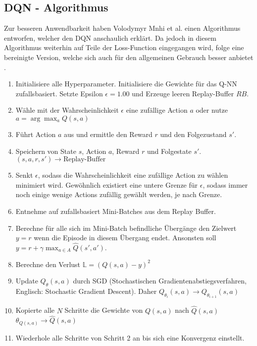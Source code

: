 \subsection{DQN - Algorithmus} \label{alg:DQN}
Zur besseren Anwendbarkeit haben Volodymyr Mnhi et al. einen Algorithmus entworfen, welcher den DQN anschaulich erklärt. Da jedoch in diesem Algorithmus weiterhin auf Teile der Loss-Function eingegangen wird, folge eine bereinigte Version, welche sich auch für den allgemeinen Gebrauch besser anbietet \cite[S. 149 f.]{DRL_Lapan}.
\begin{enumerate} 
	\item Initialisiere alle Hyperparameter. Initialisiere die Gewichte für das Q-NN zufallsbasiert. Setzte Epsilon $\epsilon = 1.00$ und Erzeuge leeren Replay-Buffer $RB$.
	\item Wähle mit der Wahrscheinlichkeit $\epsilon$  eine zufällige Action $a$ oder nutze $a = \arg\max_{a} Q(s,a)$
	\item Führt Action $a$ aus und ermittle den Reward $r$ und den Folgezustand $s'$.
	\item Speichern von State $s$, Action $a$, Reward $r$ und Folgestate $s'$. $(s,a,r,s') \longrightarrow \text{Replay-Buffer}$
	\item Senkt $\epsilon$, sodass die Wahrscheinlichkeit eine zufällige Action zu wählen minimiert wird. Gewöhnlich existiert eine untere Grenze für $\epsilon$, sodass immer noch einige wenige Actions zufällig gewählt werden, je nach Grenze.
	\item Entnehme auf zufallsbasiert Mini-Batches aus dem Replay Buffer.
	\item Berechne für alle sich im Mini-Batch befindliche Übergänge den Zielwert $y = r$ wenn die Episode in diesem Übergang endet. Ansonsten soll $y = r + \gamma \max_{a \in A}\hat{Q}(s',a')$.
	\item Berechne den Verlust $\mathbb{L} = (Q(s,a) - y)^2$
	\item Update $Q_\theta(s,a)$ durch SGD (Stochastischen Gradientenabstiegsverfahren, Englisch: Stochastic Gradient Descent). Daher $Q_{\theta_{i}}(s,a) \longrightarrow Q_{\theta_{i+1}}(s,a)$
	\item Kopierte alle $N$ Schritte die Gewichte von $Q(s,a)$ nach $\hat{Q}(s,a)$ $\theta_{Q(s,a)} \longrightarrow \hat{Q}(s,a)$
	\item Wiederhole alle Schritte von Schritt 2 an bis sich eine Konvergenz einstellt.
\end{enumerate}
